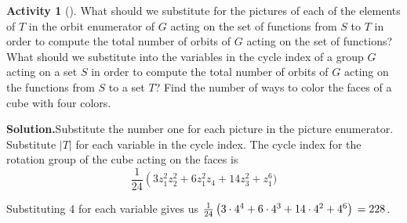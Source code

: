 \documentclass[10pt,]{book}
\theoremstyle{plain}
\theoremstyle{definition}
\newtheorem{activity}[project]{Activity}
\numberwithin{equation}{chapter}
\begin{document}
\begin{activity}[]\label{activity-329}
What should we substitute for the pictures of each of the elements of \(T\) in the orbit enumerator of \(G\) acting on the set of functions from \(S\) to \(T\) in order to compute the total number of orbits of \(G\) acting on the set of functions? What should we substitute into the variables in the cycle index of a group \(G\) acting on a set \(S\) in order to compute the total number of orbits of \(G\) acting on the functions from \(S\) to a set \(T\)? Find the number of ways to color the faces of a cube with four colors.%
\par\medskip\noindent%
\textbf{Solution.}\quad Substitute the number one for each picture in the picture enumerator. Substitute \(|T|\) for each variable in the cycle index. The cycle index for the rotation group of the cube acting on the faces is%
\begin{equation*}
\frac{1}{24}\left(3z_1^2z_2^2+ 6z_1^2z_4 +14z_3^2+z_1^6\right.)
\end{equation*}
%
\par
Substituting 4 for each variable gives us \(\frac{1}{24}\left(3\cdot4^4+6\cdot4^3+14\cdot 4^2+4^6\right)\\=228\).%
\end{activity}
\end{document}
